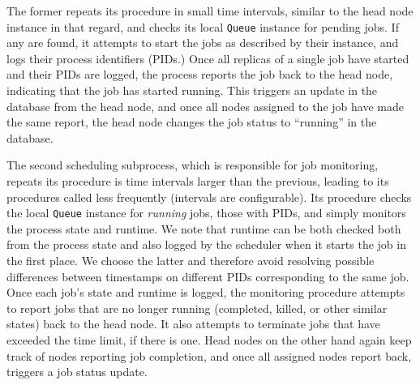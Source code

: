 \documentclass[sigconf]{acmart}
\begin{document}
The former repeats its procedure in small time intervals, similar to the head node instance in that regard, and checks its local
\verb|Queue| instance for pending jobs.
If any are found, it attempts to start the jobs as described by their instance, and logs their process identifiers (PIDs.)
Once all replicas of a single job have started and their PIDs are logged, the process reports the job back to the head node,
indicating that the job has started running. This triggers an update in the database from the head node, and once all nodes
assigned to the job have made the same report, the head node changes the job status to ``running'' in the database.

The second scheduling subprocess, which is responsible for job monitoring, repeats its procedure is time intervals larger than
the previous, leading to its procedures called less frequently (intervals are configurable).
Its procedure checks the local \verb|Queue| instance for \textit{running} jobs, those with PIDs, and simply monitors the process
state and runtime. We note that runtime can be both checked both from the process state and also logged by the scheduler when it
starts the job in the first place. We choose the latter and therefore avoid resolving possible differences between timestamps on
different PIDs corresponding to the same job.
Once each job's state and runtime is logged, the monitoring procedure attempts to report jobs that are no longer running
(completed, killed, or other similar states) back to the head node. It also attempts to terminate jobs that have exceeded the
time limit, if there is one.
Head nodes on the other hand again keep track of nodes reporting job completion, and once all assigned nodes report back,
triggers a job status update.
\end{document}
